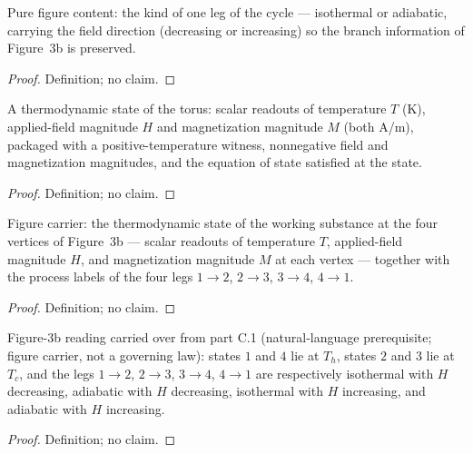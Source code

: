 \begin{definition}
\label{def:IPhO2026Problems_problem_IPhO_2026_3_C_2:ProcessKind}
Pure figure content: the kind of one leg of the cycle --- isothermal
or adiabatic, carrying the field direction (decreasing or increasing)
so the branch information of Figure~3b is preserved.
\end{definition}
\begin{proof}
Definition; no claim.
\end{proof}

\begin{definition}
\label{def:IPhO2026Problems_problem_IPhO_2026_3_C_2:ParamagnetState}
A thermodynamic state of the torus: scalar readouts of temperature
$T$ (K), applied-field magnitude $H$ and magnetization magnitude $M$
(both A/m), packaged with a positive-temperature witness, nonnegative
field and magnetization magnitudes, and the equation of state
satisfied at the state.
\end{definition}
\begin{proof}
Definition; no claim.
\end{proof}

\begin{definition}
\label{def:IPhO2026Problems_problem_IPhO_2026_3_C_2:CarnotCycle}
Figure carrier: the thermodynamic state of the working substance at
the four vertices of Figure~3b --- scalar readouts of temperature
$T$, applied-field magnitude $H$, and magnetization magnitude $M$ at
each vertex --- together with the process labels of the four legs
$1\to2$, $2\to3$, $3\to4$, $4\to1$.
\end{definition}
\begin{proof}
Definition; no claim.
\end{proof}

\begin{definition}
\label{def:IPhO2026Problems_problem_IPhO_2026_3_C_2:Figure3bAssignment}
Figure-3b reading carried over from part C.1 (natural-language
prerequisite; figure carrier, not a governing law): states $1$ and $4$
lie at $T_h$, states $2$ and $3$ lie at $T_c$, and the legs
$1\to2$, $2\to3$, $3\to4$, $4\to1$ are respectively isothermal with
$H$ decreasing, adiabatic with $H$ decreasing, isothermal with $H$
increasing, and adiabatic with $H$ increasing.
\end{definition}
\begin{proof}
Definition; no claim.
\end{proof}
